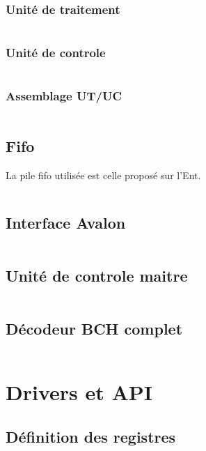 \documentclass[a4paper, 11pt, svgnames]{report}
\begin{document}
\begin{appendices}
        \subsection{Unité de traitement}
        \inputminted[firstline=0, lastline=61,breaklines]{VHDL}{../src/ut_corr.vhd}
        \subsection{Unité de controle}
        \inputminted[firstline=0, lastline=53,breaklines]{VHDL}{../src/uc_corr.vhd}
        \subsection{Assemblage UT/UC}
        \inputminted[firstline=0, lastline=45,breaklines]{VHDL}{../src/corr.vhd}

        \section{Fifo}
        La pile fifo utilisée est celle proposé sur l'Ent.
        \inputminted[firstline=0, lastline=65,breaklines]{VHDL}{../src/fifo.vhd}

        \section{Interface Avalon}
        \inputminted[firstline=0, lastline=86,breaklines]{VHDL}{../src/avalon.vhd}

        \section{Unité de controle maitre}
        \inputminted[firstline=0, lastline=90,breaklines]{VHDL}{../src/uc_master.vhd}

        \section{Décodeur BCH complet}
        \inputminted[firstline=0, lastline=113,breaklines]{VHDL}{../src/bch.vhd}

        \chapter{Drivers et API}

        \section{Définition des registres}
        \inputminted[breaklines]{C}{../quartus/ip/BCH/inc/BCH_regs.h}


\end{appendices}
\end{document}
